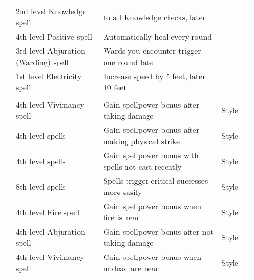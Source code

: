 \begin{longtabuwrapper}
\begin{longtabu}{>{\lcol}p{10em} >{\lcol}p{15em} >{\lcol}X >{\lcol}p{8em} >{\lcol}p{3em}}
         & 2nd level Knowledge spell &  to all Knowledge checks, later  & \x &  \\
         & 4th level Positive spell & Automatically heal every round & \x &  \\
         & 3rd level Abjuration (Warding) spell & Wards you encounter trigger one round late & \x &  \\
         & 1st level Electricity spell & Increase speed by 5 feet, later 10 feet & \x &  \\

        \midrule
         &  &  &   \\
         & 4th level Vivimancy spell & Gain spellpower bonus after taking damage & Style &  \\
         & 4th level spells & Gain spellpower bonus after making physical strike & Style &  \\
         & 4th level spells & Gain spellpower bonus with spells not cast recently & Style &  \\
         & 8th level spells & Spells trigger critical successes more easily & Style &  \\
         & 4th level Fire spell & Gain spellpower bonus when fire is near & Style &  \\
         & 4th level Abjuration spell & Gain spellpower bonus after not taking damage & Style &  \\
         & 4th level Vivimancy spell & Gain spellpower bonus when undead are near & Style &  \\


\end{longtabu}
\end{longtabuwrapper}
